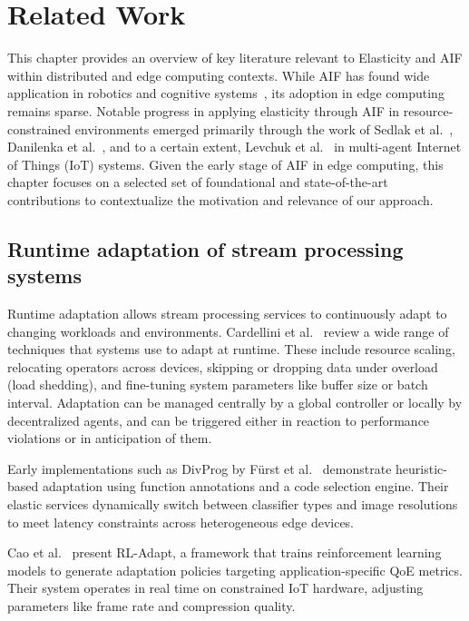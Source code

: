 \chapter{Related Work}
\label{chap:related-work}
This chapter provides an overview of key literature relevant to Elasticity and AIF within distributed and edge computing contexts. While AIF has found wide application in robotics and cognitive systems~\cite{lanillos_active_2021}, its adoption in edge computing remains sparse. Notable progress in applying elasticity through AIF in resource-constrained environments emerged primarily through the work of Sedlak et al.~\cite{sedlak_adaptive_2024, sedlak_equilibrium_2024, sedlak_active_2024, sedlak_slo-aware_2025, lapkovskis_benchmarking_2025, sedlak_towards_2025}, Danilenka et al.~\cite{danilenka_adaptive_2025}, and to a certain extent, Levchuk et al.~\cite{levchuk_active_2019} in multi-agent Internet
of Things (IoT) systems. Given the early stage of AIF in edge computing, this chapter focuses on a selected set of foundational and state-of-the-art contributions to contextualize the motivation and relevance of our approach.

\section{Runtime adaptation of stream processing systems}
Runtime adaptation allows stream processing services to continuously adapt to changing workloads and environments. Cardellini et al.~\cite{cardellini_runtime_2022} review a wide range of techniques that systems use to adapt at runtime. These include resource scaling, relocating operators across devices, skipping or dropping data under overload (load shedding), and fine-tuning system parameters like buffer size or batch interval. Adaptation can be managed centrally by a global controller or locally by decentralized agents, and can be triggered either in reaction to performance violations or in anticipation of them.

Early implementations such as DivProg by Fürst et al.~\cite{furst_elastic_2018} demonstrate heuristic-based adaptation using function annotations and a code selection engine. Their elastic services dynamically switch between classifier types and image resolutions to meet latency constraints across heterogeneous edge devices.

Cao et al.~\cite{cao_neural_2023} present RL-Adapt, a framework that trains reinforcement learning models to generate adaptation policies targeting application-specific QoE metrics. Their system operates in real time on constrained IoT hardware, adjusting parameters like frame rate and compression quality.

